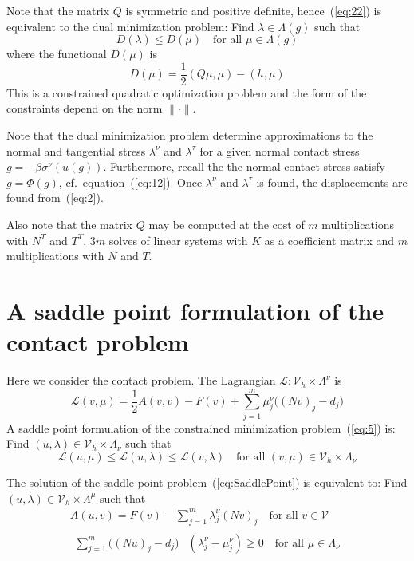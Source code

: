 \documentclass[12pt,a4paper]{article}
\numberwithin{equation}{section}
\numberwithin{table}{section}
\numberwithin{figure}{section}
\newcommand{\half}{\ensuremath{\frac{1}{2}}}
\newcommand{\V}{\ensuremath{\mathcal{V}}}
\newcommand{\Vh}{{\mathcal V}_h}
\renewcommand{\L}{{\mathcal L}}
\newcommand{\sumjm}{\sum_{j=1}^m}
\providecommand{\norm}[1]{\lVert #1 \rVert}
\newcommand{\qforall}{\quad\text{for all }}
\begin{document}
Note that the matrix $Q$ is symmetric and positive definite, hence~(\ref{eq:22}) is
equivalent to the dual minimization problem: Find $\lambda\in\Lambda(g)$
such that
\begin{equation}
  \label{eq:25}
  D(\lambda) \le D(\mu) \qforall \mu\in\Lambda(g)
\end{equation}
where the functional $D(\mu)$ is
\begin{equation}
  \label{eq:26}
  D(\mu) = \half (Q\mu, \mu)-(h, \mu)
\end{equation}
This is a constrained quadratic optimization problem and the form of the constraints
depend on the norm $\norm{\cdot}$.

Note that the dual minimization problem determine approximations to the normal and
tangential stress $\lambda^\nu$ and $\lambda^\tau$ for a given normal contact stress
$g=-\beta\sigma^\nu(u(g))$.  Furthermore, recall the the normal contact stress satisfy
$g=\Phi(g)$, cf.\ equation~(\ref{eq:12}).  Once $\lambda^\nu$ and $\lambda^\tau$ is found,
the displacements are found from~(\ref{eq:2}).

Also note that the matrix $Q$ may be computed at the cost of $m$ multiplications with $N^T$
and $T^T$, $3m$ solves of linear systems with $K$ as a coefficient matrix and $m$
multiplications with $N$ and $T$.


\section{A saddle point formulation of the contact problem}
\label{sec:saddle-point-contact}

Here we consider the contact problem.  The Lagrangian $\L \colon \Vh\times \Lambda^\nu$ is
\begin{equation}
  \label{eq:LagrangianContact}
  \L(v,\mu) = \half A(v,v) - F(v) + \sumjm \mu^\nu_j \bigl((Nv)_j-d_j\bigr)
\end{equation}
A saddle point formulation of the constrained minimization problem~(\ref{eq:5}) is: Find
$(u,\lambda)\in \Vh\times\Lambda_\nu$ such that
\begin{equation}
  \label{eq:SaddlePointContact}
  \L(u, \mu) \le \L(u,\lambda) \le \L(v,\lambda) \qforall (v,\mu) \in \Vh\times \Lambda_\nu
\end{equation}

The solution of the saddle point problem~(\ref{eq:SaddlePoint}) is equivalent to:  Find
$(u,\lambda)\in \Vh\times\Lambda^\mu$ such that
\begin{gather}
  \label{eq:LinElastContact}
  A(u,v) = F(v) - \sumjm \lambda^\nu_j (Nv)_j
  \qforall v\in\V \\
  \begin{split}
  \sumjm \bigl((Nu)_j - d_j\bigr)&(\lambda^\nu_j - \mu^\nu_j) \ge 0
  \qforall \mu \in \Lambda_\nu    
  \end{split}
  \label{eq:LagrangeMultContact}
\end{gather}
\end{document}
